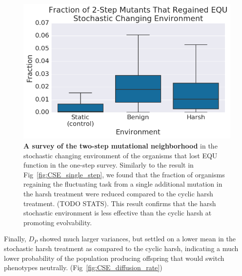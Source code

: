 \documentclass[10pt,letterpaper]{article}
\begin{document}
\begin{figure}[!h] %

\includegraphics[trim={0.2cm 0 0.4cm 0.25cm},clip,width=1\columnwidth]{figures/CSE_frac_2step__box.png}
\caption{{\bf A survey of the two-step mutational neighborhood} in the stochastic changing environment of the organisms that lost EQU function in the one-step survey. Similarly to the result in Fig~\ref{fig:CSE_single_step}, we found that the fraction of organisms regaining the fluctuating task from a single additional mutation in the harsh treatment were reduced compared to the cyclic harsh treatment. (TODO STATS). This result confirms that the harsh stochastic environment is less effective than the cyclic harsh at promoting evolvability.
}\label{fig:CSE_two_step}

\end{figure}

Finally, $D_P$ showed much larger variances, but settled on a lower mean in the stochastic harsh treatment as compared to the cyclic harsh, indicating a much lower probability of the population producing offspring that would switch phenotypes neutrally. (Fig~\ref{fig:CSE_diffusion_rate})
\end{document}
